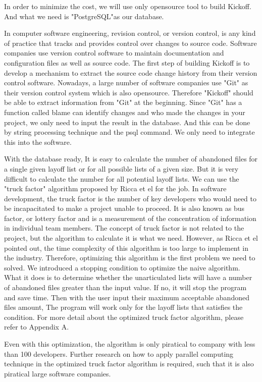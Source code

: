 \documentclass[12pt, a4paper, openright]{report}
\begin{document}
In order to minimize the cost, we will use only opensource tool to build Kickoff. And what we need is "PostgreSQL"as our database.

In computer software engineering, revision control, or version control, is any kind of practice that tracks and provides control over changes to source code. Software companies use version control software to maintain documentation and configuration files as well as source code.
The first step of building Kickoff is to develop a mechanism to extract the source code change history from their version control software. Nowadays, a large number of software companies use "Git" as their version control system which is also opensource. Therefore "Kickoff" should be able to extract information from "Git" at the beginning. Since "Git" has a function called blame can identify changes and who made the changes in your project, we only need to input the result in the database. And this can be done by string processing technique and the psql command. We only need to integrate this into the software.    

With the database ready, It is easy to calculate the number of abandoned files for a single given layoff list or for all possible lists of a given size. But it is very difficult to calculate the number for all potential layoff lists. 
We can use the "truck factor" algorithm proposed by Ricca et el \cite{Ricca2011PROFES} for the job. In software development, the truck factor is the number of key developers who would need to be incapacitated to make a project unable to proceed. It is also known as bus factor, or lottery factor and is a measurement of the concentration of information in individual team members. The concept of truck factor is not related to the project, but the algorithm to calculate it is what we need. However, as Ricca et el pointed out\cite{Ricca2011PROFES}, the time complexity of this algorithm is too large to implement in the industry. Therefore, optimizing this algorithm is the first problem we need to solved. We introduced a stopping condition to optimize the naive algorithm. What it does is to determine whether the unarticulated lists will have a number of abandoned files greater than the input value. If no, it will stop the program and save time. Then with the user input their maximum acceptable abandoned files amount, The program will work only for the layoff lists that satisfies the condition. For more detail about the optimized truck factor algorithm, please refer to Appendix A.  


Even with this optimization, the algorithm is only piratical to company with less than 100 developers. Further research on how to apply parallel computing technique in the optimized truck factor algorithm is required, such that it is also piratical large software companies.
\end{document}
